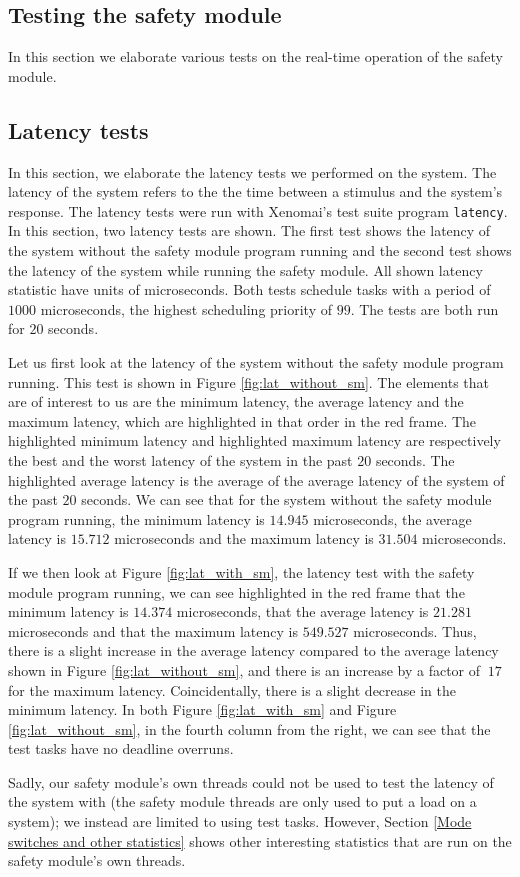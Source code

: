 \documentclass[12pt]{scrreprt}
\begin{document}
\subsection{Testing the safety module}
\label{Testing the safety module}
In this section we elaborate various tests on the real-time operation of the safety module.

\subsection{Latency tests}
\label{Latency tests}

In this section, we elaborate the latency tests we performed on the system. The latency of the system refers to the the time between a stimulus and the system's response. The latency tests were run with Xenomai's test suite program \texttt{latency}. In this section, two latency tests are shown. The first test shows the latency of the system without the safety module program running and the second test shows the latency of the system while running the safety module. All shown latency statistic have units of microseconds. Both tests schedule tasks with a period of $1000$ microseconds, the highest scheduling priority of $99$. The tests are both run for $20$ seconds. 
\par
Let us first look at the latency of the system without the safety module program running. This test is shown in Figure \ref{fig:lat_without_sm}. The elements that are of interest to us are the minimum latency, the average latency and the maximum latency, which are highlighted in that order in the red frame. The highlighted minimum latency and highlighted maximum latency are respectively the best and the worst latency of the system in the past $20$ seconds. The highlighted average latency is the average of the average latency of the system of the past $20$ seconds. We can see that for the system without the safety module program running, the minimum latency is $14.945$ microseconds, the average latency is $15.712$ microseconds and the maximum latency is $31.504$ microseconds. 
\par
If we then look at Figure \ref{fig:lat_with_sm}, the latency test with the safety module program running, we can see highlighted in the red frame that the minimum latency is $14.374$ microseconds, that the average latency is $21.281$ microseconds and that the maximum latency is $549.527$ microseconds. Thus, there is a slight increase in the average latency compared to the average latency shown in Figure \ref{fig:lat_without_sm}, and there is an increase by a factor of $~17$ for the maximum latency. Coincidentally, there is a slight decrease in the minimum latency. In both Figure \ref{fig:lat_with_sm} and Figure \ref{fig:lat_without_sm}, in the fourth column from the right, we can see that the test tasks have no deadline overruns.
\par
Sadly, our safety module's own threads could not be used to test the latency of the system with (the safety module threads are only used to put a load on a system); we instead are limited to using test tasks. However, Section \ref{Mode switches and other statistics} shows other interesting statistics that are run on the safety module's own threads.
\end{document}
